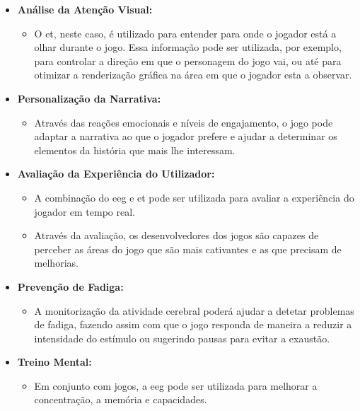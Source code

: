 \documentclass{report}
\begin{document}
\begin{itemize}
    \item \textbf{Análise da Atenção Visual:}
        \begin{itemize}
            \item O \ac{et}, neste caso, é utilizado para entender para onde o jogador está a olhar durante o jogo. Essa informação pode ser utilizada, por exemplo, para controlar a direção em que o personagem do jogo vai, ou até para otimizar a renderização gráfica na área em que o jogador esta a observar.
        \end{itemize}
    \end{itemize}
\begin{itemize}
    \item \textbf{Personalização da Narrativa:}
        \begin{itemize}
            \item Através das reações emocionais e níveis de engajamento, o jogo pode adaptar a narrativa ao que o jogador prefere e ajudar a determinar os elementos da história que mais lhe interessam.
        \end{itemize}
    \end{itemize}
\begin{itemize}
    \item \textbf{Avaliação da Experiência do Utilizador:}
        \begin{itemize}
            \item A combinação do \ac{eeg} e \ac{et} pode ser utilizada para avaliar a experiência do jogador em tempo real.
        \end{itemize}
        \begin{itemize}
            \item  Através da avaliação, os desenvolvedores dos jogos são capazes de perceber as áreas do jogo que são mais cativantes e as que precisam de melhorias.
        \end{itemize}
    \end{itemize}
\begin{itemize}
    \item \textbf{Prevenção de Fadiga:}
     \begin{itemize}
         \item A monitorização da atividade cerebral poderá ajudar a detetar problemas de fadiga, fazendo assim com que o jogo responda de maneira a reduzir a intensidade do estímulo ou sugerindo pausas para evitar a exaustão.

     \end{itemize}
     \item \textbf{Treino Mental:}
     \begin{itemize}
         \item Em conjunto com jogos, a \ac{eeg} pode ser utilizada para melhorar a concentração, a memória e capacidades.
     \end{itemize}
 \end{itemize}
\end{document}
